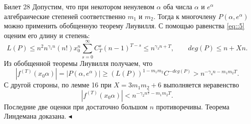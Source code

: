 \documentclass[a4paper,12pt]{article}
\newcommand{\AL}{\alpha}
\newcommand{\q}{\quad}
\newcommand{\pe}{\blacktriangleleft}
\newcommand{\SL}{\sum\limits}
\begin{document}
\newpage
\begin{mybox2}{{Билет 28}}
Допустим, что при некотором ненулевом $\AL$ оба числа \(\AL\) и $e^\AL$ алгебраические степеней соответственно $m_1$ и $m_2$. Тогда к многочлену $P(\AL, e^\AL)$ можно применить обобщенную теорему Лиувилля. С помощью равенства \ref{eq::5} оценим его длину и степень:
\[L(P)\le n^2n^{\gamma_1n}(n!)x^n_0 \SL_{s=0}^\infty C^s_T (n - 1)^{T -s} \le n^{\gamma_3n+T},\q\q deg (P)\le n + Xn.\]
Из обобщенной теоремы Лиувилля получаем, что \[|f^{(T)}(x_0\AL)| = |P(\AL, e^\AL)| \ge (L(P))^{1-m_1m_2}C^{-deg (P)} > n^{-\gamma_4n-m_1m_2T}.\]
С другой стороны, по лемме 16 при \(X = 3m_1m_2 + 6\) выполняется неравенство
\[|f^{(T)}(x_0\AL)| < n^{-\gamma_2n^\frac{3}{2} -m_1m_2T}.\]
Последние две оценки при достаточно большом $n$ противоречивы. Теорема Линдемана доказана. $\pe$



\end{mybox2}
\end{document}
